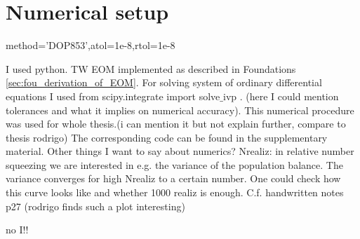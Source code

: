 \section{Numerical setup}\label{sec:numerical_setup}
method='DOP853',atol=1e-8,rtol=1e-8

I used python. TW EOM implemented as described in Foundations \autoref{sec:fou_derivation_of_EOM}. For solving system of ordinary differential equations I used from scipy.integrate import solve$\_$ivp  \cite{scipyScipyintegratesolve}. (here I could mention tolerances and what it implies on numerical accuracy). This numerical procedure was used for whole thesis.(i can mention it but not explain further, compare to thesis rodrigo) The corresponding code can be found in the supplementary material. Other things I want to say about numerics? 
Nrealiz: in relative number squeezing we are interested in e.g. the variance of the population balance. The variance converges for high Nrealiz to a certain number. One could check how this curve looks like and whether 1000 realiz is enough. C.f. handwritten notes p27 (rodrigo finds such a plot interesting)

no I!!